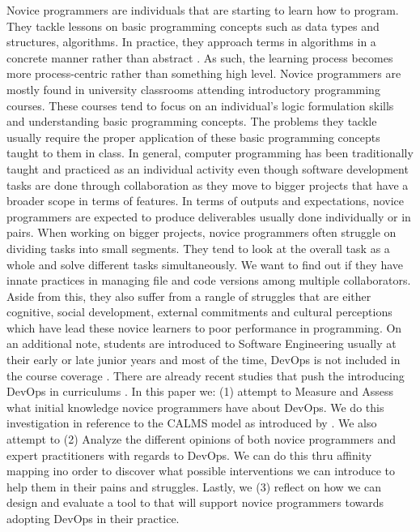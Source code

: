 \documentclass{sigchi}
\begin{document}
Novice programmers are individuals that are starting to learn how to program. They tackle lessons on basic programming concepts such as data types and structures, algorithms. In practice, they approach terms in algorithms in a concrete manner rather than abstract \cite{mccarthygame}. As such, the learning process becomes more process-centric rather than something high level\cite{teague2014longitudinal}. Novice programmers are mostly found in university classrooms attending introductory programming courses. These courses tend to focus on an individual's logic formulation skills and understanding basic programming concepts. The problems they tackle usually require the proper application of these basic programming concepts taught to them in class. In general, computer programming has been traditionally taught and practiced as an individual activity even though software development tasks are done through collaboration \cite{mcdowell2002effects} as they move to bigger projects that have a broader scope in terms of features. 
In terms of outputs and expectations, novice programmers are expected to produce deliverables usually done individually or in pairs. When working on bigger projects, novice programmers often struggle on dividing tasks into small segments. They tend to look at the overall task as a whole and solve different tasks simultaneously. We want to find out if they have innate practices in managing file and code versions among multiple collaborators. Aside from this, they also suffer from a rangle of struggles that are either cognitive, social development, external commitments and cultural perceptions which have lead these novice learners to poor performance in programming\cite{teague2008collaborative}. On an additional note, students are introduced to Software Engineering usually at their early or late junior years and most of the time, DevOps is not included in the course coverage \cite{bass2016software}. There are already recent studies that push the introducing DevOps in curriculums \cite{bruel2019software, jones2018proposal}. In this paper we: (1) attempt to Measure and Assess what initial knowledge novice programmers have about DevOps. We do this investigation in reference to the CALMS model as introduced by \cite{riley2014keep}. We also attempt to (2) Analyze the different opinions of both novice programmers and expert practitioners with regards to DevOps. We can do this thru affinity mapping ino order to discover what possible interventions we can introduce to help them in their pains and struggles. Lastly, we (3) reflect on how we can design and evaluate a tool to that will support novice programmers towards adopting DevOps in their practice. 
\end{document}
